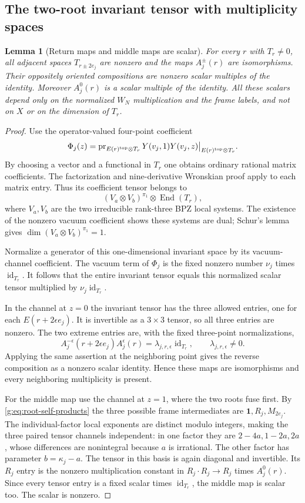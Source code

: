 \documentclass[11pt,a4paper]{article}
\numberwithin{equation}{section}
\newtheorem{lemma}[theorem]{Lemma}
\theoremstyle{definition}\newtheorem{definition}[theorem]{Definition}
\theoremstyle{remark}\newtheorem{remark}[theorem]{Remark}
\begin{document}
\subsection{The two-root invariant tensor with multiplicity spaces}
\begin{lemma}[Return maps and middle maps are scalar]
\label{g:lem:scalar-root-maps}
For every $r$ with $T_r\ne0$, all adjacent spaces $T_{r\pm2e_j}$
are nonzero and the maps $A_j^\pm(r)$ are isomorphisms. Their
oppositely oriented compositions are nonzero scalar multiples of
the identity. Moreover $A_j^0(r)$ is a scalar multiple of the
identity. All these scalars depend only on the normalized $W_N$
multiplication and the frame labels, and not on $X$ or on the
dimension of $T_r$.
\end{lemma}
\begin{proof}
Use the operator-valued four-point coefficient
\[
 \Phi_j(z)=\operatorname{pr}_{E(r)^{\rm top}\otimes T_r}
                Y(v_j,1)Y(v_j,z)\big|_{E(r)^{\rm top}\otimes T_r}.
\]
By choosing a vector and a functional in $T_r$ one obtains ordinary
rational matrix coefficients. The factorization and nine-derivative
Wronskian proof apply to each matrix entry. Thus its coefficient
tensor belongs to
\[
 (V_a\otimes V_b)^{\pi_1}\otimes\operatorname{End}(T_r),
\]
where $V_a,V_b$ are the two irreducible rank-three BPZ local systems.
The existence of the nonzero vacuum coefficient shows these systems
are dual; Schur's lemma gives
$\dim(V_a\otimes V_b)^{\pi_1}=1$.

Normalize a generator of this one-dimensional invariant space by
its vacuum-channel coefficient. The vacuum term of $\Phi_j$ is
the fixed nonzero number $\nu_j$ times $\operatorname{id}_{T_r}$.
It follows that the entire invariant tensor equals this normalized
scalar tensor multiplied by $\nu_j\operatorname{id}_{T_r}$.

In the channel at $z=0$ the invariant tensor has the three allowed
entries, one for each $E(r+2\epsilon e_j)$. It is invertible as a
$3\times3$ tensor, so all three entries are nonzero. The two extreme
entries are, with the fixed three-point normalizations,
\[
 A_j^{-\epsilon}(r+2\epsilon e_j)A_j^\epsilon(r)
          =\lambda_{j,r,\epsilon}\operatorname{id}_{T_r},
 \qquad \lambda_{j,r,\epsilon}\ne0.
\]
Applying the same assertion at the neighboring point gives the
reverse composition as a nonzero scalar identity. Hence these maps
are isomorphisms and every neighboring multiplicity is present.

For the middle map use the channel at $z=1$, where the two roots
fuse first. By \eqref{g:eq:root-self-products} the three possible frame intermediates are
$\mathbf1,R_j,M_{2e_j}$. The individual-factor local exponents
are distinct modulo integers, making the three paired tensor
channels independent: in one factor they are
$2-4a,1-2a,2a$, whose differences are nonintegral because $a$ is
irrational. The other factor has parameter $b=\kappa_j-a$.
The tensor in this basis is again diagonal and invertible. Its
$R_j$ entry is the nonzero multiplication constant in
$R_j\cdot R_j\to R_j$ times $A_j^0(r)$. Since every tensor
entry is a fixed scalar times $\operatorname{id}_{T_r}$, the
middle map is scalar too. The scalar is nonzero.
\end{proof}
\end{document}
